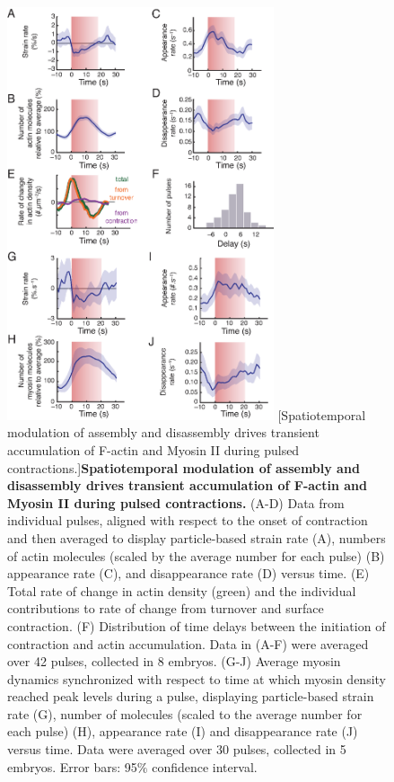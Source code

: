 \documentclass{ucetd}
\begin{document}
\begin{figure}[!htbp]
\centering
\includegraphics[width=0.7\textwidth]{Figure2-3}
[Spatiotemporal modulation of assembly and disassembly drives transient accumulation of F-actin and Myosin II during pulsed contractions.]{\textbf{Spatiotemporal modulation of assembly and disassembly drives transient accumulation of F-actin and Myosin II during pulsed contractions.} (A-D) Data from individual pulses, aligned with respect to the onset of contraction and then averaged to display particle-based strain rate (A), numbers of actin molecules (scaled by the average number for each pulse) (B) appearance rate (C), and disappearance rate (D) versus time.  (E) Total rate of change in actin density (green) and the individual contributions to rate of change from turnover and surface contraction. (F) Distribution of time delays between the initiation of contraction and actin accumulation. Data in (A-F) were averaged over 42 pulses, collected in 8 embryos. (G-J) Average myosin dynamics synchronized with respect to time at which myosin density reached peak levels during a pulse, displaying particle-based strain rate (G), number of molecules (scaled to the average number for each pulse) (H), appearance rate (I) and disappearance rate (J) versus time. Data were averaged over 30 pulses, collected in 5 embryos. Error bars: 95$\%$ confidence interval. }
\end{figure}
\end{document}
